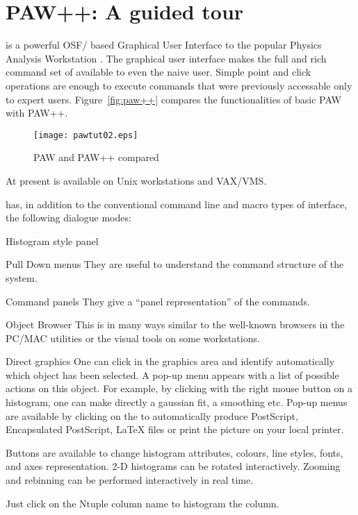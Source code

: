 
\chapter{PAW++: A guided tour}

\PAWPP{} is a powerful OSF/\MOTIF{} based Graphical User Interface to
the popular Physics Analysis Workstation \XPAW.  The graphical user interface
makes the full and rich command set of \XPAW{} available to even the naive
user. Simple point and click operations are enough to execute commands that
were previously accessable only to expert users.
Figure~\vref{fig:paw++} compares the functionalities of basic PAW with
PAW++.

\begin{figure}[H]
\centering\texttt{[image: pawtut02.eps]}
\caption{PAW and PAW++ compared}
\label{fig:paw++}
\end{figure}

At present \PAWPP{} is available on Unix workstations and VAX/VMS.

\PAWPP{} has, in addition to the conventional command line and macro types of
interface, the following dialogue modes:

\begin{DL}{Histogram style panel}
\item[Pull Down menus] They are useful to understand the command structure of
      the \XPAW{} system.
\item[Command panels] They give a ``panel representation'' of the commands.
\item[Object Browser] This is in many ways similar to the well-known browsers
      in the PC/MAC utilities or the visual tools on some workstations.
\item[Direct graphics] One can click in the graphics area and identify
      automatically which object has been selected. A pop-up menu appears
      with a list of possible actions on this object. For example, by clicking
      with the right mouse button on a histogram, one can make directly a
      gaussian fit, a smoothing etc.
      Pop-up menus are available by clicking on the \GW{} to
      automatically produce PostScript, Encapsulated PostScript, \LaTeX{} files
      or print the picture on your local printer.
\item[\HSP] Buttons are available to change
      histogram attributes, colours, line styles, fonts, and
      axes representation.
      2-D histograms can be rotated interactively. Zooming and rebinning can
      be performed interactively in real time.
\item[\NV] Just click on the Ntuple column name to histogram
      the column.
\end{DL}


